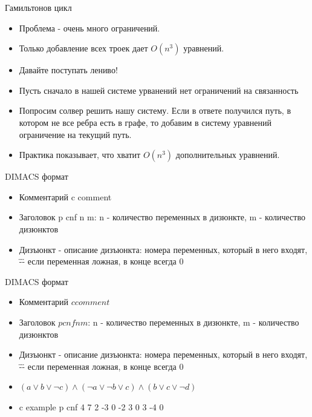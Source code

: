 \documentclass{beamer}
\begin{document}
\begin{frame}{Гамильтонов цикл}
\begin{itemize}
\item Проблема - очень много ограничений.
\item Только добавление всех троек дает $O(n^3)$ уравнений.
\item Давайте поступать лениво!
\item Пусть сначало в нашей системе урванений нет ограничений на связанность
\item Попросим солвер решить нашу систему. Если в ответе получился путь, в котором не все ребра есть в графе, то добавим в
систему уравнений ограничение на текущий путь.
\item Практика показывает, что хватит $O(n^3)$ дополнительных уравнений.
\end{itemize}
\end{frame}

\begin{frame}{DIMACS формат}
\begin{itemize}
\item Комментарий c comment
\item Заголовок p cnf n m: n - количество переменных в дизюнкте, m - количество дизюнктов
\item Дизъюнкт - описание дизъюнкта: номера переменных, который в него входят, \"-\" - если переменная ложная, в конце всегда 0
\end{itemize}
\end{frame}

\begin{frame}{DIMACS формат}
\begin{itemize}
\item Комментарий $c comment$
\item Заголовок $p cnf n m$: n - количество переменных в дизюнкте, m - количество дизюнктов
\item Дизъюнкт - описание дизъюнкта: номера переменных, который в него входят, \"-\" - если переменная ложная, в конце всегда 0
\item $(a \vee b \vee \lnot c) \wedge (\lnot a \vee \lnot b \vee c) \wedge (b \vee c \vee \lnot d)$
\item c example\newline
p cnf 4 7 2 -3 0 -2 3 0 3 -4 0\newline
\end{itemize}
\end{frame}
\end{document}
